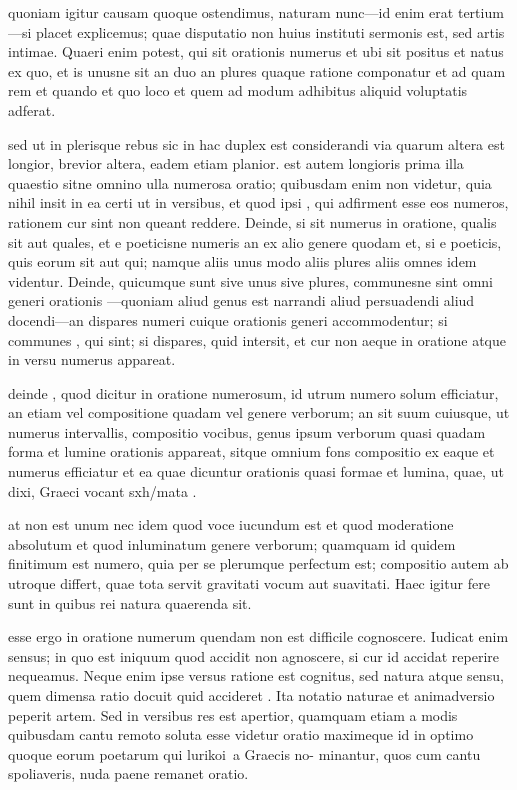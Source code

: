  quoniam igitur causam quoque ostendimus, naturam nunc—id enim erat tertium—si placet explicemus; quae disputatio non huius instituti sermonis est, sed artis intimae. Quaeri enim potest, qui sit orationis numerus et ubi sit positus et natus ex quo, et is unusne sit an duo an plures quaque ratione componatur et ad quam rem et quando et quo loco et quem ad modum adhibitus aliquid voluptatis adferat.

 sed ut in plerisque rebus sic in hac duplex est considerandi via quarum altera est longior, brevior altera, eadem etiam planior. est autem longioris prima illa quaestio sitne omnino ulla numerosa oratio; quibusdam enim non videtur, quia nihil insit in ea certi ut in versibus, et quod ipsi , qui adfirment esse eos numeros, rationem cur sint non queant reddere. Deinde, si sit numerus in oratione, qualis sit aut quales, et e poeticisne numeris an ex alio genere quodam et, si e poeticis, quis eorum sit aut qui; namque aliis unus modo aliis plures aliis omnes idem videntur. Deinde, quicumque sunt sive unus sive plures, communesne sint omni generi orationis —quoniam aliud genus est narrandi aliud persuadendi aliud docendi—an dispares numeri cuique orationis generi accommodentur; si communes , qui sint; si dispares, quid intersit, et cur non aeque in oratione atque in versu numerus appareat.

 deinde , quod dicitur in oratione numerosum, id utrum numero solum efficiatur, an etiam vel compositione quadam vel genere verborum; an sit suum cuiusque, ut numerus intervallis, compositio vocibus, genus ipsum verborum quasi quadam forma et lumine orationis appareat, sitque omnium fons compositio ex eaque et numerus efficiatur et ea quae dicuntur orationis quasi formae et lumina, quae, ut dixi, Graeci vocant sxh/mata .

 at non est unum nec idem quod voce iucundum est et quod moderatione absolutum et quod inluminatum genere verborum; quamquam id quidem finitimum est numero, quia per se plerumque perfectum est; compositio autem ab utroque differt, quae tota servit gravitati vocum aut suavitati. Haec igitur fere sunt in quibus rei natura quaerenda sit.

 esse ergo in oratione numerum quendam non est difficile cognoscere. Iudicat enim sensus; in quo est iniquum quod accidit non agnoscere, si cur id accidat reperire nequeamus. Neque enim ipse versus ratione est cognitus, sed natura atque sensu, quem dimensa ratio docuit quid accideret . Ita notatio naturae et animadversio peperit artem. Sed in versibus res est apertior, quamquam etiam a modis quibusdam cantu remoto soluta esse videtur oratio maximeque id in optimo quoque eorum poetarum qui lurikoi\ a Graecis no- minantur, quos cum cantu spoliaveris, nuda paene remanet oratio.

